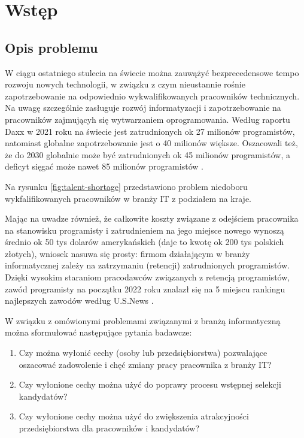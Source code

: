 
\chapter*{Wstęp}\label{ch:admission}

\section*{Opis problemu}\label{sec:admission:problem-description}

W ciągu ostatniego stulecia na świecie można zauwążyć bezprecedensowe tempo rozwoju nowych technologii,
w związku z czym nieustannie rośnie zapotrzebowanie na odpowiednio wykwalifikowanych pracowników technicznych.
Na uwagę szczególnie zasługuje rozwój informatyzacji i zapotrzebowanie na pracowników zajmującyh się wytwarzaniem oprogramowania.
Według raportu Daxx w 2021 roku na świecie jest zatrudnionych ok 27 milionów programistów, natomiast globalne zapotrzebowanie jest o 40 milionów większe.
Oszacowali też, że do 2030 globalnie może być zatrudnionych ok 45 milionów programistów, a deficyt sięgać może nawet 85 milionów programistów \cite{daxx-2021}.

Na rysunku \ref{fig:talent-shortage} przedstawiono problem niedoboru wykfalifikowanych pracowników w branży IT z podziałem na kraje.


Mając na uwadze również, że całkowite koszty związane z odejściem pracownika na stanowisku programisty i zatrudnieniem na jego miejsce nowego
wynoszą średnio ok 50 tys dolarów amerykańskich \cite{hairing-dev-2021} (daje to kwotę ok 200 tys polskich złotych), wniosek nasuwa się prosty:
firmom działającym w branży informatycznej zależy na zatrzymaniu (retencji) zatrudnionych programistów.
Dzięki wysokim staraniom pracodawców związanych z retencją programistów,
zawód programisty na początku 2022 roku znalazł się na 5 miejscu rankingu najlepszych zawodów według U.S.News \cite{us-news-2022}.

W związku z omówionymi problemami związanymi z branżą informatyczną można sformułować następujące pytania badawcze:
\begin{enumerate}
    \item Czy można wyłonić cechy (osoby lub przedsiębiorstwa) pozwalające oszacować zadowolenie i chęć zmiany pracy pracownika z branży IT?
    \item Czy wyłonione cechy można użyć do poprawy procesu wstępnej selekcji kandydatów?
    \item Czy wyłonione cechy można użyć do zwiększenia atrakcyjności przedsiębiorstwa dla pracowników i kandydatów?
\end{enumerate}

